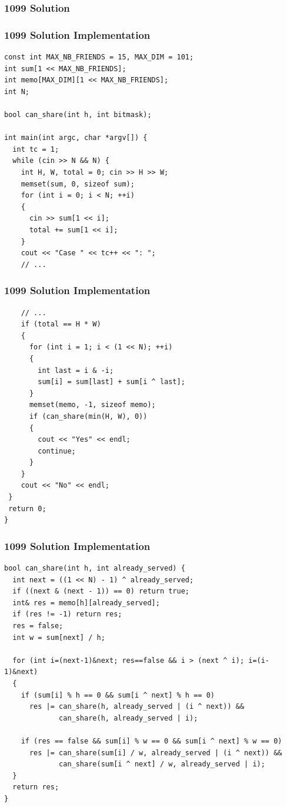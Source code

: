 \documentclass{beamer}
\begin{document}
\ifanswers

\begin{frame}%
\frametitle{1099 Solution}

\end{frame}

\begin{frame}[fragile]
\frametitle{1099 Solution Implementation}

\scriptsize
\begin{lstlisting}
const int MAX_NB_FRIENDS = 15, MAX_DIM = 101;
int sum[1 << MAX_NB_FRIENDS];
int memo[MAX_DIM][1 << MAX_NB_FRIENDS];
int N;

bool can_share(int h, int bitmask);

int main(int argc, char *argv[]) {
  int tc = 1;
  while (cin >> N && N) {
    int H, W, total = 0; cin >> H >> W;
    memset(sum, 0, sizeof sum);
    for (int i = 0; i < N; ++i)
    {
      cin >> sum[1 << i];
      total += sum[1 << i];
    }
    cout << "Case " << tc++ << ": ";
    // ...
\end{lstlisting}

\end{frame}

\begin{frame}[fragile]
\frametitle{1099 Solution Implementation}

\scriptsize
\begin{lstlisting}
    // ...
    if (total == H * W)
    {
      for (int i = 1; i < (1 << N); ++i)
      {
        int last = i & -i;
        sum[i] = sum[last] + sum[i ^ last];
      }
      memset(memo, -1, sizeof memo);
      if (can_share(min(H, W), 0))
      {
        cout << "Yes" << endl;
        continue;
      }
    }
    cout << "No" << endl;
 }
 return 0;
}
\end{lstlisting}

\end{frame}

\begin{frame}[fragile]
\frametitle{1099 Solution Implementation}

\scriptsize
\begin{lstlisting}
bool can_share(int h, int already_served) {
  int next = ((1 << N) - 1) ^ already_served;
  if ((next & (next - 1)) == 0) return true;
  int& res = memo[h][already_served];
  if (res != -1) return res;
  res = false;
  int w = sum[next] / h;

  for (int i=(next-1)&next; res==false && i > (next ^ i); i=(i-1)&next)
  {
    if (sum[i] % h == 0 && sum[i ^ next] % h == 0)
      res |= can_share(h, already_served | (i ^ next)) &&
             can_share(h, already_served | i);

    if (res == false && sum[i] % w == 0 && sum[i ^ next] % w == 0)
      res |= can_share(sum[i] / w, already_served | (i ^ next)) &&
             can_share(sum[i ^ next] / w, already_served | i);
  }
  return res;
}
\end{lstlisting}

\end{frame}
\end{document}
